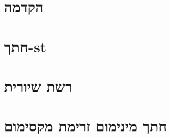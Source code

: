 \documentclass[]{article}
\def\lecnum{11}
\def\insert#1{}
\def\stcut{חתך-\textenglish{st}}
\begin{document}


\section*{הקדמה}
\insert{intro}

\section*{\stcut}
\insert{cuts}

\section*{רשת שיורית}
\insert{residual}

\section*{חתך מינימום זרימת מקסימום}
\insert{mincutmaxflow}
\end{document}
